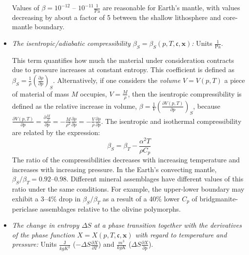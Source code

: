 \documentclass{article}
\begin{document}
\begin{itemize}
   Values of $\beta=10^{-12}$ -- $10^{-11} \frac{1}{\textrm{Pa}}$
   are reasonable for Earth's mantle, with values decreasing by about a factor of 5 between the shallow lithosphere and core-mantle boundary.

\item \textit{The isentropic/adiabatic compressibility $\beta_S=\beta_S(p,T,\mathfrak c ,\mathbf x)$:} Units
  $\frac{1}{\textrm{Pa}}$.

  This term quantifies how much the material under consideration
  contracts due to pressure increases at constant entropy.
  This coefficient is defined as
  $\beta_S = \frac{1}{\rho} \left( \frac{\partial \rho}{\partial p} \right)_{S}$.
  Alternatively, if
  one considers the \textit{volume} $V=V(p, T)$ a piece of material of mass $M$
  occupies, $V=\frac{M}{\rho}$, then the isentropic compressibility
  is defined as the relative increase in volume,
  $\beta=\frac{1}{V}\left(\frac{\partial V(p, T)}{\partial p}\right)_{S}$, because 
  $\frac{\partial V(p, T)}{\partial p} =
   \frac{\partial \frac{M}{\rho}}{\partial p} =
   -\frac{M}{\rho^2} \frac{\partial \rho}{\partial p} =
   -\frac{V}{\rho} \frac{\partial \rho}{\partial p}$.
   The isentropic and isothermal compressibility are related by the expression:
   \begin{equation}
     \beta_S = \beta_T - \frac{\alpha^2 T}{\rho C_p}
   \end{equation}
   The ratio of the compressibilities decreases with increasing temperature
   and increases with increasing pressure. In the Earth's convecting mantle,
   $\beta_S/\beta_T = 0.92$--$0.98$. Different mineral assemblages have
   different values of this ratio under the same conditions. For example, the
   upper-lower boundary may exhibit a 3--4\% drop in $\beta_S / \beta_T$
   as a result of a 40\% lower $C_p$ of bridgmanite-periclase assemblages
   relative to the olivine polymorphs.
   
   
\item \textit{The change in entropy $\Delta S$ at a
  phase transition together with the derivatives of the phase function
  $X=X(p,T,\mathfrak c,\mathbf x)$ with regard to temperature and pressure:} Units
  $\frac{\textrm{J}}{\si{kg}\si{K}^2}$ ($-\Delta S \frac{\partial X}{\partial T}$) and
  $\frac{\si{m}^3}{\si{kg}\si{K}}$ ($\Delta S \frac{\partial X}{\partial p}$).


\end{itemize}
\end{document}
